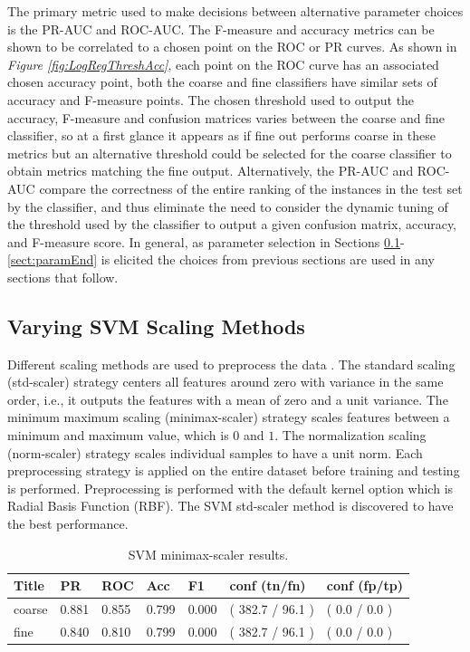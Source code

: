 \documentclass[ms]{nuthesis}
\begin{document}
\par The primary metric used to make decisions between alternative parameter choices is the PR-AUC and
ROC-AUC. The F-measure and accuracy metrics can be shown to be correlated to a chosen point on the ROC or
PR curves. As shown in \textit{Figure \ref{fig:LogRegThreshAcc}}, %
each point on the ROC curve has an associated chosen accuracy point, both the coarse and fine classifiers have similar
sets of accuracy and F-measure points. The chosen threshold used to output the accuracy, F-measure and confusion matrices
varies between the coarse and fine classifier, so at a first glance it appears as if fine out performs coarse in these
metrics but an alternative threshold could be selected for the coarse classifier to obtain metrics matching the fine
output. Alternatively, the PR-AUC and ROC-AUC compare the correctness of the entire ranking of the
instances in the test set by the classifier, and thus eliminate the need to consider the dynamic tuning of the threshold
used by the classifier to output a given confusion matrix, accuracy, and F-measure score. In general,
as parameter selection in Sections \ref{sect:paramStart}-\ref{sect:paramEnd} is
elicited the choices from previous sections
are used in any sections that follow.



\subsection{Varying SVM Scaling Methods}
\label{sect:paramStart}
\par Different scaling methods are used to preprocess the data
\cite{scikit-learn}. The standard scaling (std-scaler) strategy
centers all features around zero with variance in the same order, i.e., it
outputs the features with a mean of zero
and a unit variance. The minimum maximum scaling (minimax-scaler) strategy scales features between a minimum and maximum value,
which is $0$ and $1$. The normalization scaling (norm-scaler) strategy scales individual
samples to have a unit norm. Each
preprocessing strategy is applied on the entire dataset before training and testing
is performed. Preprocessing is performed
with the default kernel option which is Radial Basis Function (RBF). The SVM std-scaler method
is discovered to have the best performance.

\FloatBarrier

\begin{table}[H]
\centering
\caption{SVM minimax-scaler results.}
\label{tab:SVMMinMax}
\begin{tabular}{|l||l||l||l||l||l||l|}\toprule
Title & PR & ROC & Acc & F1 & conf (tn/fn) & conf (fp/tp) \\ \midrule
coarse & 0.881 & 0.855 & 0.799 & 0.000 & ( 382.7 / 96.1 ) & ( 0.0 / 0.0 ) \\
fine & 0.840 & 0.810 & 0.799 & 0.000 & ( 382.7 / 96.1 ) & ( 0.0 / 0.0 ) \\ \bottomrule
\end{tabular}
\end{table}
\FloatBarrier
\end{document}
